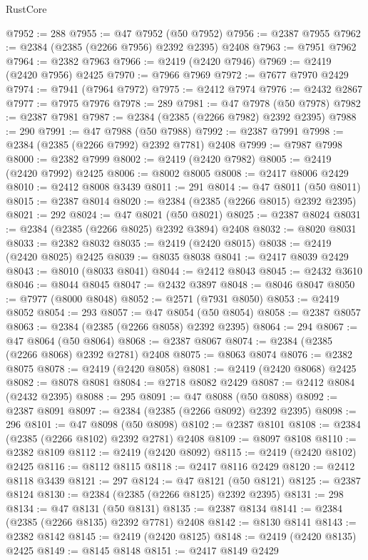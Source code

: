 \begin{lexlean}{RustCore}
\begin{coremodule}
@7952 := 288
@7955 := @47 @7952 (@50 @7952)
@7956 := @2387 @7955
@7962 := @2384 (@2385 (@2266 @7956) @2392 @2395) @2408
@7963 := @7951 @7962
@7964 := @2382 @7963
@7966 := @2419 (@2420 @7946)
@7969 := @2419 (@2420 @7956) @2425
@7970 := @7966 @7969
@7972 := @7677 @7970 @2429
@7974 := @7941 (@7964 @7972)
@7975 := @2412 @7974
@7976 := @2432 @2867
@7977 := @7975 @7976
@7978 := 289
@7981 := @47 @7978 (@50 @7978)
@7982 := @2387 @7981
@7987 := @2384 (@2385 (@2266 @7982) @2392 @2395)
@7988 := 290
@7991 := @47 @7988 (@50 @7988)
@7992 := @2387 @7991
@7998 := @2384 (@2385 (@2266 @7992) @2392 @7781) @2408
@7999 := @7987 @7998
@8000 := @2382 @7999
@8002 := @2419 (@2420 @7982)
@8005 := @2419 (@2420 @7992) @2425
@8006 := @8002 @8005
@8008 := @2417 @8006 @2429
@8010 := @2412 @8008 @3439
@8011 := 291
@8014 := @47 @8011 (@50 @8011)
@8015 := @2387 @8014
@8020 := @2384 (@2385 (@2266 @8015) @2392 @2395)
@8021 := 292
@8024 := @47 @8021 (@50 @8021)
@8025 := @2387 @8024
@8031 := @2384 (@2385 (@2266 @8025) @2392 @3894) @2408
@8032 := @8020 @8031
@8033 := @2382 @8032
@8035 := @2419 (@2420 @8015)
@8038 := @2419 (@2420 @8025) @2425
@8039 := @8035 @8038
@8041 := @2417 @8039 @2429
@8043 := @8010 (@8033 @8041)
@8044 := @2412 @8043
@8045 := @2432 @3610
@8046 := @8044 @8045
@8047 := @2432 @3897
@8048 := @8046 @8047
@8050 := @7977 (@8000 @8048)
@8052 := @2571 (@7931 @8050)
@8053 := @2419 @8052
@8054 := 293
@8057 := @47 @8054 (@50 @8054)
@8058 := @2387 @8057
@8063 := @2384 (@2385 (@2266 @8058) @2392 @2395)
@8064 := 294
@8067 := @47 @8064 (@50 @8064)
@8068 := @2387 @8067
@8074 := @2384 (@2385 (@2266 @8068) @2392 @2781) @2408
@8075 := @8063 @8074
@8076 := @2382 @8075
@8078 := @2419 (@2420 @8058)
@8081 := @2419 (@2420 @8068) @2425
@8082 := @8078 @8081
@8084 := @2718 @8082 @2429
@8087 := @2412 @8084 (@2432 @2395)
@8088 := 295
@8091 := @47 @8088 (@50 @8088)
@8092 := @2387 @8091
@8097 := @2384 (@2385 (@2266 @8092) @2392 @2395)
@8098 := 296
@8101 := @47 @8098 (@50 @8098)
@8102 := @2387 @8101
@8108 := @2384 (@2385 (@2266 @8102) @2392 @2781) @2408
@8109 := @8097 @8108
@8110 := @2382 @8109
@8112 := @2419 (@2420 @8092)
@8115 := @2419 (@2420 @8102) @2425
@8116 := @8112 @8115
@8118 := @2417 @8116 @2429
@8120 := @2412 @8118 @3439
@8121 := 297
@8124 := @47 @8121 (@50 @8121)
@8125 := @2387 @8124
@8130 := @2384 (@2385 (@2266 @8125) @2392 @2395)
@8131 := 298
@8134 := @47 @8131 (@50 @8131)
@8135 := @2387 @8134
@8141 := @2384 (@2385 (@2266 @8135) @2392 @7781) @2408
@8142 := @8130 @8141
@8143 := @2382 @8142
@8145 := @2419 (@2420 @8125)
@8148 := @2419 (@2420 @8135) @2425
@8149 := @8145 @8148
@8151 := @2417 @8149 @2429

\end{coremodule}
\end{lexlean}
